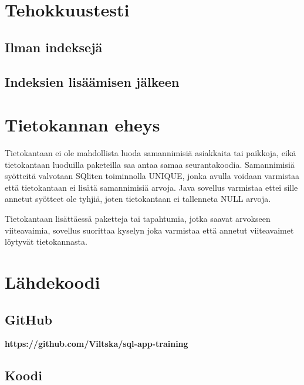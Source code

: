 \documentclass[12pt,a4paper]{article}
\begin{document}
\newpage
\section{Tehokkuustesti}
\subsection*{Ilman indeksejä}
\subsection*{Indeksien lisäämisen jälkeen}

\newpage
\section{Tietokannan eheys}
Tietokantaan ei ole mahdollista luoda samannimisiä asiakkaita tai paikkoja, eikä tietokantaan luoduilla paketeilla saa antaa samaa seurantakoodia. Samannimisiä syötteitä valvotaan SQliten toiminnolla UNIQUE, jonka avulla voidaan varmistaa että tietokantaan ei lisätä samannimisiä arvoja. Java sovellus varmistaa ettei sille annetut syötteet ole tyhjiä, joten tietokantaan ei tallenneta NULL arvoja.

Tietokantaan lisättäessä paketteja tai tapahtumia, jotka saavat arvokseen viiteavaimia, sovellus suorittaa kyselyn joka varmistaa että annetut viiteavaimet löytyvät tietokannasta.





\newpage
\section{Lähdekoodi}
\subsection*{GitHub}
\left \textbf{https://github.com/Viltska/sql-app-training} \right
\subsection*{Koodi}


\newpage
\end{document}
